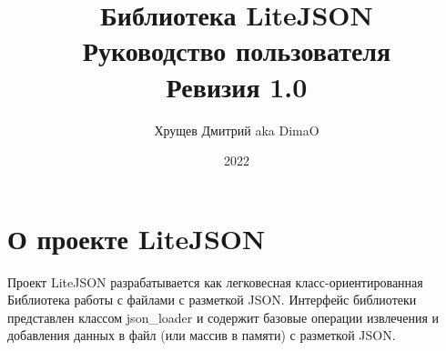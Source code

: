 \documentclass[a4paper, draft]{article}
\title{Библиотека LiteJSON \\ Руководство пользователя \\ Ревизия 1.0}
\author{Хрущев Дмитрий aka DimaO}
\date{2022}
\begin{document}
\maketitle
\newpage
\tableofcontents
\newpage

\section{О проекте LiteJSON}
Проект LiteJSON разрабатывается как легковесная класс-ориентированная Библиотека
работы с файлами с разметкой JSON. Интерфейс библиотеки представлен классом
json_loader и содержит базовые операции извлечения и добавления данных в файл
(или массив в памяти) с разметкой JSON.
\end{document}
